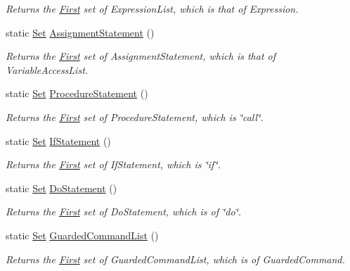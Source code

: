 \begin{DoxyCompactItemize}
\begin{DoxyCompactList}\small\item\em Returns the \hyperlink{classFirst}{First} set of ExpressionList, which is that of Expression. \item\end{DoxyCompactList}\item 
static \hyperlink{classSet}{Set} \hyperlink{classFirst_a0b4661a1cddafd8b7140c0baf5af8b0a}{AssignmentStatement} ()
\begin{DoxyCompactList}\small\item\em Returns the \hyperlink{classFirst}{First} set of AssignmentStatement, which is that of VariableAccessList. \item\end{DoxyCompactList}\item 
static \hyperlink{classSet}{Set} \hyperlink{classFirst_a4119362212a222c5b738957f325927ef}{ProcedureStatement} ()
\begin{DoxyCompactList}\small\item\em Returns the \hyperlink{classFirst}{First} set of ProcedureStatement, which is \char`\"{}call\char`\"{}. \item\end{DoxyCompactList}\item 
static \hyperlink{classSet}{Set} \hyperlink{classFirst_aa05d413f60b740bc9f594f76b51b0d6e}{IfStatement} ()
\begin{DoxyCompactList}\small\item\em Returns the \hyperlink{classFirst}{First} set of IfStatement, which is \char`\"{}if\char`\"{}. \item\end{DoxyCompactList}\item 
static \hyperlink{classSet}{Set} \hyperlink{classFirst_a163746bc8795e5f57ccd145a4f462a73}{DoStatement} ()
\begin{DoxyCompactList}\small\item\em Returns the \hyperlink{classFirst}{First} set of DoStatement, which is of \char`\"{}do\char`\"{}. \item\end{DoxyCompactList}\item 
static \hyperlink{classSet}{Set} \hyperlink{classFirst_a1ab37b8f1947f33138b6a880e0731f5f}{GuardedCommandList} ()
\begin{DoxyCompactList}\small\item\em Returns the \hyperlink{classFirst}{First} set of GuardedCommandList, which is of GuardedCommand. \item\end{DoxyCompactList}\item 

\end{DoxyCompactItemize}
